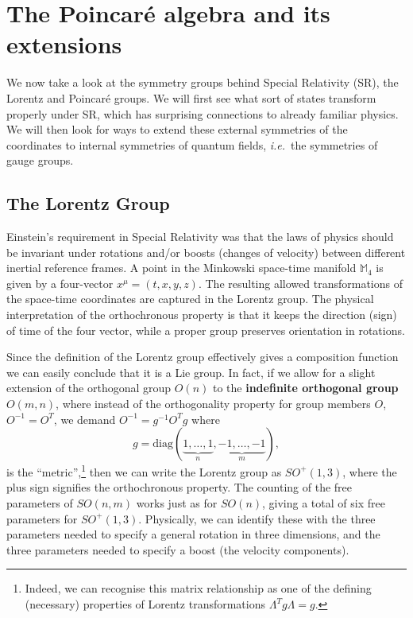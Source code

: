 \documentclass[notes.tex]{subfiles}
\begin{document}
\chapter{The Poincar\'{e} algebra and its extensions}
\label{chap:poincare}

We now take a look at the symmetry groups behind Special Relativity (SR), the Lorentz and Poincar\'{e} groups. We will first see what sort of states transform properly under SR, which has surprising connections to already familiar physics. We will then look for ways to extend these external symmetries of the coordinates to internal symmetries of quantum fields, {\it i.e.}\ the symmetries of gauge groups.


\section{The Lorentz Group}
Einstein's requirement in Special Relativity was that the laws of physics should be invariant under rotations and/or boosts (changes of velocity) between different inertial reference frames. A point in the Minkowski space-time manifold $\mathbb{M}_4$ is given by a four-vector $x^\mu = (t,x,y,z)$. The resulting allowed transformations of the space-time coordinates are captured in the Lorentz group.
The physical interpretation of the orthochronous property is that it keeps the direction (sign) of time of the four vector, while a proper group preserves orientation in rotations.

Since the definition of the Lorentz group effectively gives a composition function we can easily conclude that it is a Lie group. In fact, if we allow for a slight extension of the orthogonal group $O(n)$ to the {\bf indefinite orthogonal group} $O(m,n)$, where instead of the orthogonality property for group members $O$, $O^{-1}=O^T$, we demand $O^{-1}=g^{-1}O^Tg$ where
\[g=\text{diag}(\underbrace{1,\ldots,1}_n,\underbrace{-1,\ldots,-1}_m),\] is the ``metric'',\footnote{Indeed, we can recognise this matrix relationship as one of the defining (necessary) properties of Lorentz transformations $\Lambda^Tg\Lambda=g$.} then we can write the Lorentz group as $SO^+(1,3)$, where the plus sign signifies the orthochronous property. The counting of the free parameters of $SO(n,m)$ works just as for $SO(n)$, giving a total of six free parameters for  $SO^+(1,3)$. Physically, we can identify these with the three parameters needed to specify a general rotation in three dimensions, and the three parameters needed to specify a boost (the velocity components).
\end{document}
